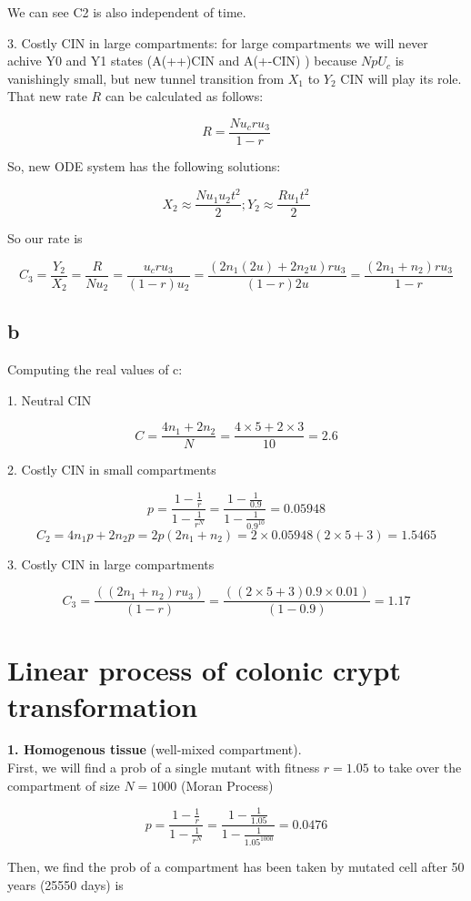 We can see C2 is also independent of time.

3.	Costly CIN in large compartments: for large compartments we will never achive Y0 and Y1 states (A(++)CIN  and A(+-CIN) )  because $N p U_c$ is vanishingly small, but new tunnel transition from $X_1$ to $Y_2$ CIN will play its role. That new rate $R$ can be calculated as follows:

\[ R = \frac{Nu_cru_3}{1-r} \]

So, new ODE system has the following solutions:

\[ X_2 \approx \frac{Nu_1u_2t^2}{2} ; Y_2 \approx \frac{Ru_1t^2}{2} \]

So our rate is

\[ C_3 = \frac{Y_2}{X_2} = \frac{R}{Nu_2} = \frac{u_cru_3}{(1-r)u_2} = \frac{(2n_1(2u)+2n_2u)ru_3}{(1-r)2u} = \frac{(2n_1+n_2)ru_3}{1-r}\]

\subsection{b}
Computing the real values of c:

1. Neutral CIN

\[ C = \frac{4n_1+2n_2}{N} = \frac{4\times 5+2 \times 3}{10} = \boxed{2.6} \]

2. Costly CIN in small compartments

\[ p = \frac{1-\frac{1}{r}}{1 - \frac{1}{r^N}} = \frac{1-\frac{1}{0.9}}{1-\frac{1}{0.9^{10}}} = 0.05948  \]
\[ C_2 = 4n_1p+2n_2p = 2p(2n_1+n_2 )=2\times0.05948(2\times5+3)=\boxed{1.5465} \]

3. Costly CIN in large compartments

\[ C_3=\frac{((2n_1+n_2)ru_3)}{(1-r)}=\frac{((2\times5+3)0.9\times0.01)}{(1-0.9)}=\boxed{1.17} \]


\setcounter{chapter}{2}
\setcounter{section}{0}
\section{Linear process of colonic crypt transformation}

\textbf{1. Homogenous tissue} (well-mixed compartment).\\
First, we will find a prob of a single mutant with fitness $r=1.05$ to take over the compartment of size $N=1000$ (Moran Process)

\[ p = \frac{1-\frac{1}{r}}{1 - \frac{1}{r^N}} = \frac{1-\frac{1}{1.05}}{1-\frac{1}{1.05^{1000}}} = 0.0476  \]

Then, we find the prob of a compartment has been taken by mutated cell after 50 years (25550 days) is 

